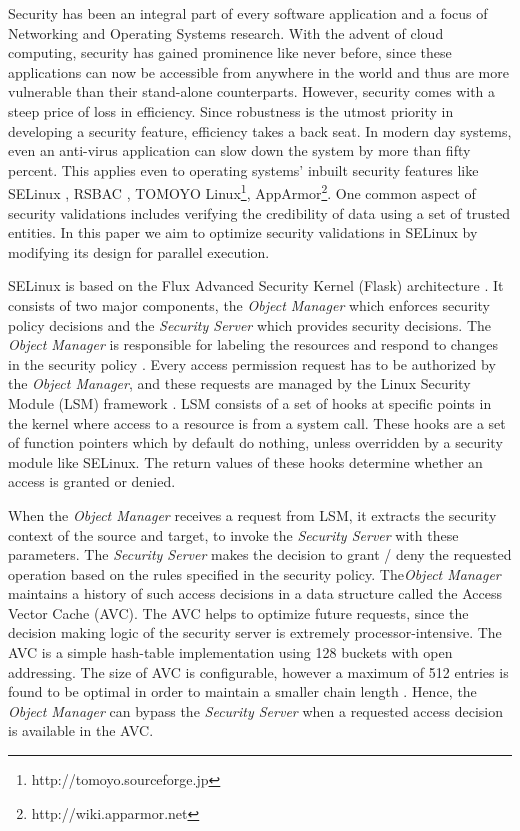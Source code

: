 \documentclass[conference]{IEEEtran}
\begin{document}
Security has been an integral part of every software
application and a focus of Networking and Operating Systems research. %
With the advent of cloud computing,
security has gained prominence like never before, since these
applications can now be accessible from anywhere in the world and thus
are more vulnerable than their stand-alone counterparts. However,
security comes with a steep price of loss in efficiency. Since
robustness is the utmost priority in developing a security feature,
efficiency takes a back seat. In modern day systems, even an
anti-virus application can slow down the system by more than fifty
percent. This applies even to operating systems' inbuilt security
features like SELinux \cite{s1}, RSBAC \cite{s2}, TOMOYO 
Linux\footnote{http://tomoyo.sourceforge.jp}, AppArmor\footnote{http://wiki.apparmor.net}. One common aspect of security
validations includes verifying the credibility of data using a set of
trusted entities. In this paper we aim to optimize security
validations in SELinux by modifying its design for parallel execution.

SELinux is based on the Flux Advanced Security Kernel (Flask)
architecture \cite{flask}. It consists of two major components, the
\emph{Object Manager} which enforces security policy decisions and the
\emph{Security Server} which provides security decisions. The \emph{Object
Manager} is responsible for labeling the resources and respond to
changes in the security policy \cite{flask}. Every access permission
request has to be authorized by the \emph{Object Manager}, and these requests
are managed by the Linux Security Module (LSM) framework
\cite{selinuxBook}. LSM consists of a set of hooks at specific points
in the kernel where access to a resource is from a system call. These
hooks are a set of function pointers which by default do nothing,
unless overridden by a security module like SELinux. The return values
of these hooks determine whether an access is granted or denied.

When the \emph{Object Manager} receives a request from LSM, it
extracts the security context of the source and target, to invoke the
\emph{Security Server} with these parameters. The \emph{Security Server} makes the
decision to grant / deny the requested operation based on the rules
specified in the security policy. The\emph{Object Manager} maintains a
history of such access decisions in a data structure called the Access
Vector Cache (AVC). The AVC helps to optimize future requests, since
the decision making logic of the security server is extremely
processor-intensive. The AVC is a simple hash-table implementation
using 128 buckets with open addressing. The size of AVC is
configurable, however a maximum of 512 entries is found to be optimal
in order to maintain a smaller chain length \cite{selinuxBook}. Hence,
the \emph{Object Manager} can bypass the \emph{Security Server} when a requested
access decision is available in the AVC.
\end{document}
